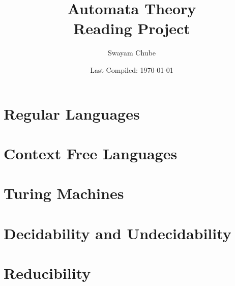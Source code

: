 \documentclass[12pt]{report}
\title{Automata Theory\\Reading Project}
\author{Swayam Chube}
\date{Last Compiled: \today}
\begin{document}
    \maketitle
    \tableofcontents
    \chapter{Regular Languages}
    
	\chapter{Context Free Languages}
	
	\chapter{Turing Machines}
	
	\chapter{Decidability and Undecidability}
	
	\chapter{Reducibility}
	
\end{document}
